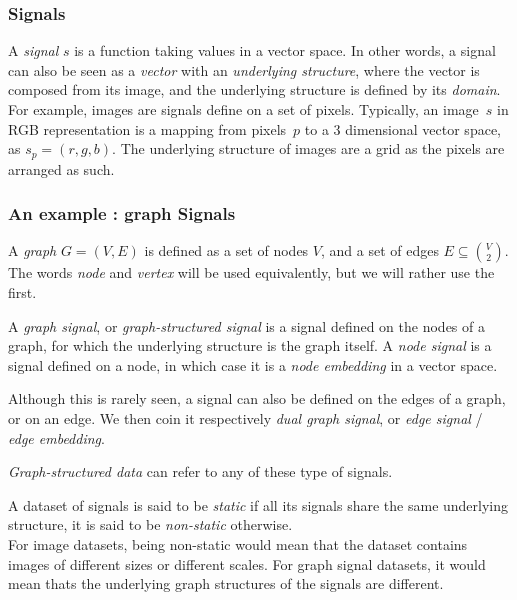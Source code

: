 \documentclass{article}
\begin{document}
\subsubsection{Signals}

A \emph{signal} $s$ is a function taking values in a vector space. In other words, a signal can also be seen as a \emph{vector} with an \emph{underlying structure}, where the vector is composed from its image, and the underlying structure is defined by its \emph{domain}.\\

For example, images are signals define on a set of pixels. Typically, an image~$s$ in RGB representation is a mapping from pixels~$p$ to a 3 dimensional vector space, as $s_p = (r,g,b)$. The underlying structure of images are a grid as the pixels are arranged as such.

\begin{figure}

\end{figure}

\subsubsection{An example : graph Signals}

A \emph{graph} $G = (V, E)$ is defined as a set of nodes $V$, and a set of edges $E \subseteq\binom{V}{2}$. The words \emph{node} and \emph{vertex} will be used equivalently, but we will rather use the first.

A \emph{graph signal}, or \emph{graph-structured signal} is a signal defined on the nodes of a graph, for which the underlying structure is the graph itself.
A \emph{node signal} is a signal defined on a node, in which case it is a \emph{node embedding} in a vector space.

Although this is rarely seen, a signal can also be defined on the edges of a graph, or on an edge. We then coin it respectively \emph{dual graph signal}, or \emph{edge signal} / \emph{edge embedding}.

\emph{Graph-structured data} can refer to any of these type of signals.

A dataset of signals is said to be \emph{static} if all its signals share the same underlying structure, it is said to be \emph{non-static} otherwise.\\
For image datasets, being non-static would mean that the dataset contains images of different sizes or different scales. For graph signal datasets, it would mean thats the underlying graph structures of the signals are different.
\end{document}
